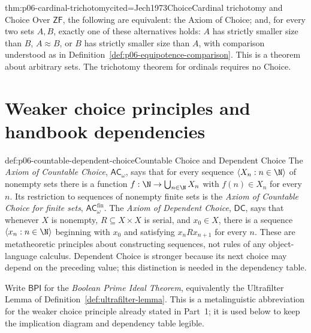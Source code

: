\begin{hbtheorem}{thm:p06-cardinal-trichotomy}{cited=Jech1973Choice}{Cardinal trichotomy and Choice}
Over \(\mathsf{ZF}\), the following are equivalent: the Axiom of Choice; and,
for every two sets \(A,B\), exactly one of these alternatives holds:
\(A\) has strictly smaller size than \(B\), \(A\approx B\), or \(B\) has
strictly smaller size than \(A\), with comparison understood as in
Definition~\ref{def:p06-equipotence-comparison}.  This is a theorem about
arbitrary sets.  The trichotomy theorem for ordinals requires no Choice.
\end{hbtheorem}

\section[Weaker choice principles]{Weaker choice principles and handbook dependencies}

\begin{hbdefinition}{def:p06-countable-dependent-choice}{Countable Choice and Dependent Choice}
The \emph{Axiom of Countable Choice}, \(\mathsf{AC}_{\omega}\), says that
for every sequence \(\langle X_n:n\in\N\rangle\) of nonempty sets there is
a function \(f:\N\to\bigcup_{n\in\N}X_n\) with \(f(n)\in X_n\) for every
\(n\).  Its restriction to sequences of nonempty finite sets is the
\emph{Axiom of Countable Choice for finite sets},
\(\mathsf{AC}_{\omega}^{\mathrm{fin}}\).  The \emph{Axiom of Dependent
Choice}, \(\mathsf{DC}\), says that whenever \(X\) is nonempty,
\(R\subseteq X\times X\) is serial, and \(x_0\in X\), there is a sequence
\(\langle x_n:n\in\N\rangle\) beginning with \(x_0\) and satisfying
\(x_nRx_{n+1}\) for every \(n\).
These are metatheoretic principles about constructing sequences, not rules of
any object-language calculus.  Dependent Choice is stronger because its next
choice may depend on the preceding value; this distinction is needed in the
dependency table.
\end{hbdefinition}

Write \(\mathsf{BPI}\) for the \emph{Boolean Prime Ideal Theorem}, equivalently
the Ultrafilter Lemma of Definition~\ref{def:ultrafilter-lemma}.  This is a
metalinguistic abbreviation for the weaker choice principle already stated in
Part~1; it is used below to keep the implication diagram and dependency table
legible.

